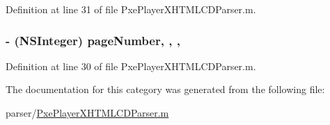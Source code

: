 Definition at line 31 of file Pxe\-Player\-X\-H\-T\-M\-L\-C\-D\-Parser.\-m.

\hypertarget{category_pxe_player_x_h_t_m_l_c_d_parser_07_08_a5e9f533018e5f99629b39831cf74e747}{
\subsubsection[{page\-Number}]{\setlength{\rightskip}{0pt plus 5cm}-\/ (N\-S\-Integer) page\-Number\hspace{0.3cm}{\ttfamily [read]}, {\ttfamily [write]}, {\ttfamily [nonatomic]}, {\ttfamily [assign]}}}\label{category_pxe_player_x_h_t_m_l_c_d_parser_07_08_a5e9f533018e5f99629b39831cf74e747}


Definition at line 30 of file Pxe\-Player\-X\-H\-T\-M\-L\-C\-D\-Parser.\-m.



The documentation for this category was generated from the following file\-:\begin{DoxyCompactItemize}
\item 
parser/\hyperlink{_pxe_player_x_h_t_m_l_c_d_parser_8m}{Pxe\-Player\-X\-H\-T\-M\-L\-C\-D\-Parser.\-m}\end{DoxyCompactItemize}
